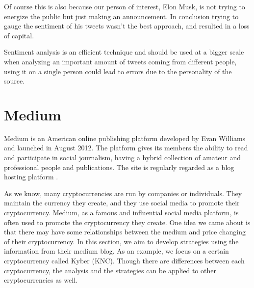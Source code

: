 \documentclass[twoside]{report}
\begin{document}
\begin{spacing}{1}
Of course this is also because our person of interest, Elon Musk, is not trying to energize the public but just making an announcement. In conclusion trying to gauge the sentiment of his tweets wasn't the best approach, and resulted in a loss of capital.

Sentiment analysis is an efficient technique and should be used at a bigger scale when analyzing an important amount of tweets coming from different people, using it on a single person could lead to errors due to the personality of the source.





\section{Medium}\label{sec:medium}
Medium is an American online publishing platform developed by Evan Williams and launched in August 2012. The platform gives its members the ability to read and participate in social journalism, having a hybrid collection of amateur and professional people and publications. The site is regularly regarded as a blog hosting platform \cite{streitfeld2017internet}.




As we know, many cryptocurrencies are run by companies or individuals. They maintain the currency they create, and they use social media to promote their cryptocurrency. Medium, as a famous and influential social media platform, is often used to promote the cryptocurrency they create. One idea we came about is that there may have some relationships between the medium and price changing of their cryptocurrency. In this section, we aim to develop strategies using the information from their medium blog. As an example, we focus on a certain cryptocurrency called Kyber (KNC). Though there are differences between each cryptocurrency, the analysis and the strategies can be applied to other cryptocurrencies as well. 




\end{spacing}
\end{document}
